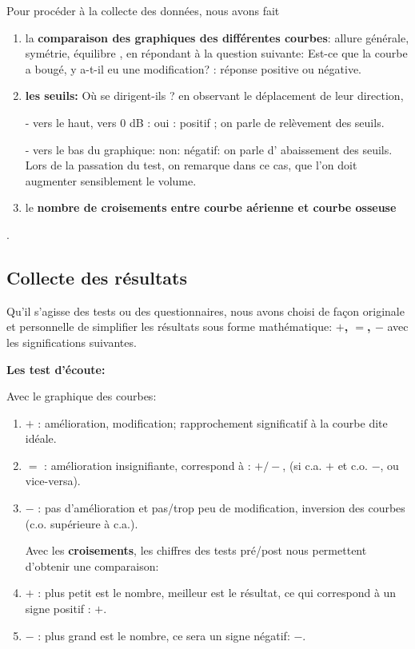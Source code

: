 Pour procéder à la collecte des données, nous avons fait 
\begin{enumerate}
		
		\item la \textbf{comparaison des graphiques des différentes courbes}: allure générale, symétrie, 
		équilibre , en répondant à la question suivante:  
		Est-ce que la courbe a bougé, y a-t-il eu une modification? : réponse  positive ou négative.
		
	\item \textbf{les seuils: }
	Où se dirigent-ils ? 
	en observant le déplacement de leur direction,
	
	-   vers le haut, vers 0 dB : oui : positif ; on parle de relèvement des seuils.
	
	
	-   vers le bas du graphique: non: négatif: on parle d' abaissement des seuils.
	Lors de la passation du test, on remarque dans ce cas, que l'on doit augmenter sensiblement le 
	volume.
	
	\item le \textbf{nombre de croisements entre courbe aérienne et courbe osseuse}
\end{enumerate}.
 \subsection*{Collecte des résultats} 
Qu'il s'agisse des tests ou des questionnaires, nous avons choisi de façon originale et personnelle de
simplifier les résultats sous forme 
mathématique:  \textbf{ $+$, $=$, $-$ } avec les significations suivantes.


\textbf { Les test d'écoute: } 


Avec  le graphique des courbes:
\begin{enumerate}
	\item$+$   : amélioration, modification;  rapprochement significatif à la courbe dite idéale.
	\item$=$   : amélioration insignifiante, correspond à : $+/-$, (si c.a. $ + $ et c.o. $-$, ou vice-versa).
	
	\item$-$   : pas d'amélioration et pas/trop peu  de modification, inversion
	des courbes (c.o. supérieure à c.a.).
	
	Avec les \textbf{croisements}, les chiffres des tests pré/post
	nous permettent d'obtenir une comparaison:
	\item $+$ : plus petit est le nombre, meilleur est le résultat, ce qui correspond à un signe positif : $+$.
	\item$-$   : plus grand est le nombre, ce sera un signe négatif: $-$.
\end{enumerate}

